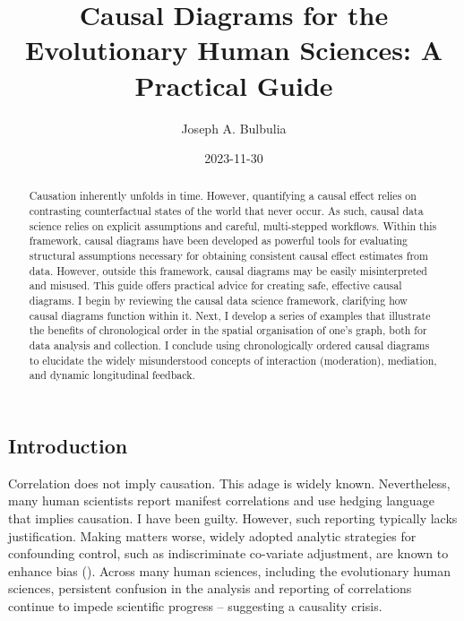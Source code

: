 \documentclass[
  singlecolumn,
  9pt]{article}
\title{Causal Diagrams for the Evolutionary Human Sciences: A Practical
Guide}
\author{Joseph A. Bulbulia}
\affil{%
                  Victoria University of Wellington, New Zealand, School
                  of Psychology, Centre for Applied Cross-Cultural
                  Research
              }
\date{2023-11-30}
\begin{document}
\maketitle
\begin{abstract}
Causation inherently unfolds in time. However, quantifying a causal
effect relies on contrasting counterfactual states of the world that
never occur. As such, causal data science relies on explicit assumptions
and careful, multi-stepped workflows. Within this framework, causal
diagrams have been developed as powerful tools for evaluating structural
assumptions necessary for obtaining consistent causal effect estimates
from data. However, outside this framework, causal diagrams may be
easily misinterpreted and misused. This guide offers practical advice
for creating safe, effective causal diagrams. I begin by reviewing the
causal data science framework, clarifying how causal diagrams function
within it. Next, I develop a series of examples that illustrate the
benefits of chronological order in the spatial organisation of one's
graph, both for data analysis and collection. I conclude using
chronologically ordered causal diagrams to elucidate the widely
misunderstood concepts of interaction (moderation), mediation, and
dynamic longitudinal feedback.
\end{abstract}
\subsection{Introduction}\label{introduction}

Correlation does not imply causation. This adage is widely known.
Nevertheless, many human scientists report manifest correlations and use
hedging language that implies causation. I have been guilty. However,
such reporting typically lacks justification. Making matters worse,
widely adopted analytic strategies for confounding control, such as
indiscriminate co-variate adjustment, are known to enhance bias
(). Across many human
sciences, including the evolutionary human sciences, persistent
confusion in the analysis and reporting of correlations continue to
impede scientific progress -- suggesting a causality crisis.
\end{document}
